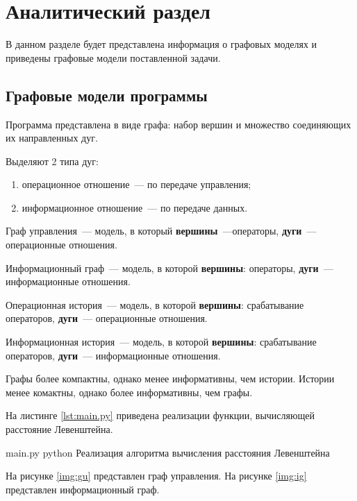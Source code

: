 \chapter{Аналитический раздел}

В данном разделе будет представлена информация о графовых моделях и приведены графовые модели поставленной задачи.


\section{Графовые модели программы}

Программа представлена в виде графа: набор вершин и множество соединяющих их направленных дуг.


Выделяют 2 типа дуг:
\begin{enumerate}
	\item операционное отношение~--- по передаче управления;
	\item информационное отношение~--- по передаче данных.
\end{enumerate}

Граф управления~--- модель, в который \textbf{вершины}~---операторы, \textbf{дуги}~--- операционные отношения.

Информационный граф~--- модель, в которой \textbf{вершины}: операторы, \textbf{дуги}~--- информационные отношения.

Операционная история~--- модель, в которой \textbf{вершины}: срабатывание операторов, \textbf{дуги}~--- операционные отношения.

Информационная история~--- модель, в которой \textbf{вершины}: срабатывание операторов, \textbf{дуги}~--- информационные отношения.

Графы более компактны, однако менее информативны, чем истории. Истории менее комактны, однако более информативны, чем графы.

На листинге \ref{lst:main.py} приведена реализации функции, вычисляющей расстояние Левенштейна.

\clearpage

{main.py} %
{python} %
{Реализация алгоритма вычисления расстояния Левенштейна} %

\clearpage


На рисунке \ref{img:gu} представлен граф управления.
На рисунке \ref{img:ig} представлен информационный граф.


